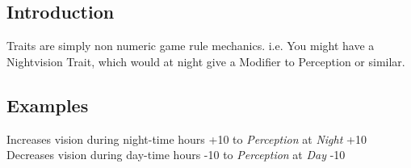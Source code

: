 
\subsection{Introduction}
\Glspl{Trait} are simply non numeric game rule mechanics. i.e.
You might have a Nightvision Trait, which would at night give a
\gls{Modifier} to Perception or similar.

\subsection{Examples}

	{Increases vision during night-time hours}
	{+10 to \emph{Perception} at \emph{Night}}
	{+10}
	{Decreases vision during day-time hours}
	{-10 to \emph{Perception} at \emph{Day}}
	{-10}

